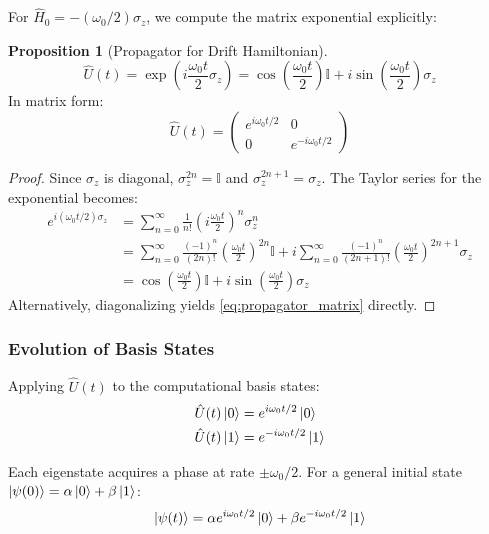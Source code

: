 \documentclass[11pt,a4paper]{article}
\theoremstyle{definition}
\newtheorem{proposition}[theorem]{Proposition}
\theoremstyle{remark}
\newcommand{\identity}{\mathbb{I}}
\begin{document}
For $\hat{H}_0 = -(\omega_0/2) \sigma_z$, we compute the matrix exponential explicitly:

\begin{proposition}[Propagator for Drift Hamiltonian]
\begin{equation}
\hat{U}(t) = \exp\left(i \frac{\omega_0 t}{2} \sigma_z \right)
= \cos\left(\frac{\omega_0 t}{2}\right) \identity + i \sin\left(\frac{\omega_0 t}{2}\right) \sigma_z
\label{eq:propagator}
\end{equation}
In matrix form:
\begin{equation}
\hat{U}(t) = \begin{pmatrix}
e^{i \omega_0 t / 2} & 0 \\
0 & e^{-i \omega_0 t / 2}
\end{pmatrix}
\label{eq:propagator_matrix}
\end{equation}
\end{proposition}

\begin{proof}
Since $\sigma_z$ is diagonal, $\sigma_z^{2n} = \identity$ and $\sigma_z^{2n+1} = \sigma_z$. The Taylor series for the exponential becomes:
\begin{align}
e^{i (\omega_0 t / 2) \sigma_z}
&= \sum_{n=0}^\infty \frac{1}{n!} \left(i \frac{\omega_0 t}{2}\right)^n \sigma_z^n \\
&= \sum_{n=0}^\infty \frac{(-1)^n}{(2n)!} \left(\frac{\omega_0 t}{2}\right)^{2n} \identity
+ i \sum_{n=0}^\infty \frac{(-1)^n}{(2n+1)!} \left(\frac{\omega_0 t}{2}\right)^{2n+1} \sigma_z \\
&= \cos\left(\frac{\omega_0 t}{2}\right) \identity + i \sin\left(\frac{\omega_0 t}{2}\right) \sigma_z
\end{align}
Alternatively, diagonalizing yields \eqref{eq:propagator_matrix} directly.
\end{proof}

\subsubsection{Evolution of Basis States}

Applying $\hat{U}(t)$ to the computational basis states:
\begin{align}
\hat{U}(t) \ket{0} &= e^{i \omega_0 t / 2} \ket{0} \label{eq:evolve_0} \\
\hat{U}(t) \ket{1} &= e^{-i \omega_0 t / 2} \ket{1} \label{eq:evolve_1}
\end{align}

Each eigenstate acquires a phase at rate $\pm \omega_0 / 2$. For a general initial state $\ket{\psi(0)} = \alpha \ket{0} + \beta \ket{1}$:
\begin{equation}
\ket{\psi(t)} = \alpha e^{i \omega_0 t / 2} \ket{0} + \beta e^{-i \omega_0 t / 2} \ket{1}
\label{eq:general_evolution}
\end{equation}
\end{document}
